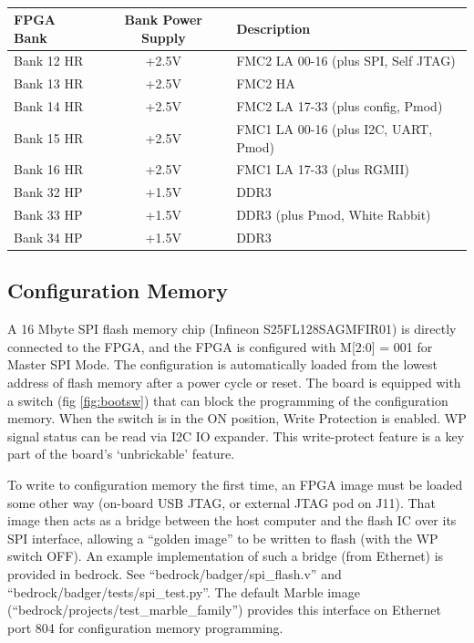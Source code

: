 \documentclass[12pt,oneside,a4]{article}
\begin{document}
\begin{table}[htbp]
\centering
\begin{tabular}{@{}lcl@{}}
\toprule
FPGA Bank  & Bank Power Supply & Description \\ \midrule
Bank 12 HR & +2.5V             & FMC2 LA 00-16 (plus SPI, Self JTAG) \\
Bank 13 HR & +2.5V             & FMC2 HA\\
Bank 14 HR & +2.5V             & FMC2 LA 17-33 (plus config, Pmod)\\
Bank 15 HR & +2.5V             & FMC1 LA 00-16 (plus I2C, UART, Pmod)\\
Bank 16 HR & +2.5V             & FMC1 LA 17-33 (plus RGMII)\\
Bank 32 HP & +1.5V             & DDR3        \\
Bank 33 HP & +1.5V             & DDR3 (plus Pmod, White Rabbit) \\
Bank 34 HP & +1.5V             & DDR3       \\ \bottomrule
\end{tabular}
\caption{}
\label{tab:banks}
\end{table}

\subsection{Configuration Memory}\label{sec:Overview:Configuration}

A 16 Mbyte SPI flash memory chip (Infineon S25FL128SAGMFIR01) is directly connected to the FPGA,
and the FPGA is configured with M[2:0] = 001 for Master SPI Mode.
The configuration is automatically loaded from the lowest address of flash memory after a power cycle or reset.
The board is equipped with a switch (fig \ref{fig:bootsw}) that can block the programming of the configuration memory.
When the switch is in the ON position, Write Protection is enabled. WP signal status can be read via I2C IO expander.
This write-protect feature is a key part of the board's `unbrickable' feature.

To write to configuration memory the first time, an FPGA image must be loaded some other way
(on-board USB JTAG, or external JTAG pod on J11).
That image then acts as a bridge between the host computer and the flash IC over its SPI interface,
allowing a ``golden image'' to be written to flash (with the WP switch OFF).
An example implementation of such a bridge (from Ethernet) is provided in bedrock.
See ``bedrock/badger/spi\_flash.v'' and ``bedrock/badger/tests/spi\_test.py''.
The default Marble image (``bedrock/projects/test\_marble\_family'') provides this interface on Ethernet port 804
for configuration memory programming.
\end{document}
